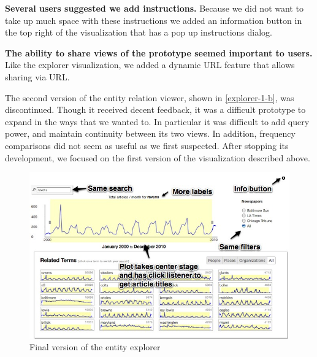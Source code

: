 \textbf{Several users suggested we add instructions.} Because we did not want to take up much space with these instructions we added an information button in the top right of the visualization that has a pop up instructions dialog.

\textbf{The ability to share views of the prototype seemed important to users.} Like the explorer visualization, we added a dynamic URL feature that allows sharing via URL.

The second version of the entity relation viewer, shown in \ref{explorer-1-b}, was discontinued. Though it received decent feedback, it was a difficult prototype to expand in the ways that we wanted to. In particular it was difficult to add query power, and maintain continuity between its two views. In addition, frequency comparisons did not seem as useful as we first suspected. After stopping its development, we focused on the first version of the visualization described above.

\begin{figure}[htb]
  \centerline{
    \includegraphics[scale=0.37]{figures/finalTe.jpg}
  }
  \caption{Final version of the entity explorer}
  \label{fig:explorer-1}
\end{figure}
